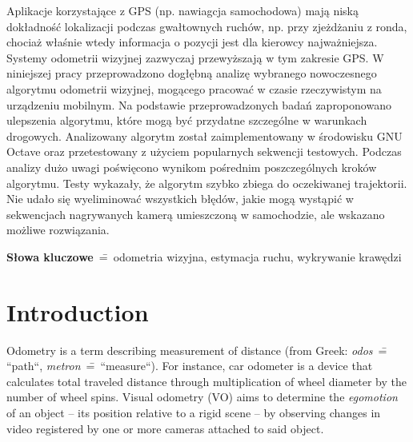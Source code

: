 Aplikacje korzystające z GPS (np. nawiagcja samochodowa) mają niską dokładno\'sć lokalizacji podczas gwałtownych ruchów, np. przy zjeżdżaniu z ronda, chociaż wła\'snie wtedy informacja o pozycji jest dla kierowcy najważniejsza.
Systemy odometrii wizyjnej zazwyczaj przewyższają w tym zakresie GPS.
W niniejszej pracy przeprowadzono dogłębną analizę wybranego nowoczesnego algorytmu odometrii wizyjnej, mogącego pracować w czasie rzeczywistym na urządzeniu mobilnym. Na podstawie przeprowadzonych badań zaproponowano ulepszenia algorytmu, które mogą być przydatne szczególne w warunkach drogowych.
Analizowany algorytm został zaimplementowany w \'srodowisku GNU Octave oraz przetestowany z użyciem popularnych sekwencji testowych. Podczas analizy dużo uwagi po\'swięcono wynikom pośrednim poszczególnych kroków algorytmu.
Testy wykazały, że algorytm szybko zbiega do oczekiwanej trajektorii. Nie udało się wyeliminować wszystkich błędów, jakie mogą wystąpić w sekwencjach nagrywanych kamerą umieszczoną w samochodzie, ale wskazano możliwe rozwiązania.

\textbf{S\l{}owa kluczowe}~\==~odometria wizyjna, estymacja ruchu, wykrywanie kraw\k{e}dzi

\newpage

\section*{Introduction}


Odometry is a term describing measurement of distance (from Greek: \textit{odos}~\==~ ``path``, \textit{metron}~\==~``measure``). For instance, car odometer is a device that calculates total traveled distance through multiplication of wheel diameter by the number of wheel spins. Visual odometry (VO) aims to determine the \textit{egomotion} of an object -- its position relative to a rigid scene -- by observing changes in video registered by one or more cameras attached to said object.

